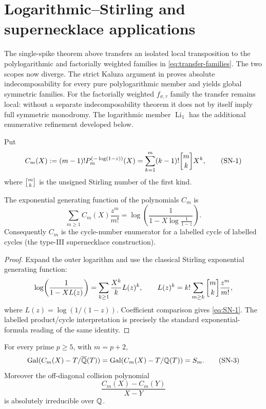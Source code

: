 \section{Logarithmic--Stirling and supernecklace applications}
\label{sec:supernecklace}

The single-spike theorem above transfers an isolated local transposition to
the polylogarithmic and factorially weighted families in
\eqref{eq:transfer-families}.  The two scopes now diverge.  The strict Kaluza
argument in  proves absolute indecomposability for
every pure polylogarithmic member and yields global symmetric families.  For
the factorially weighted $f_{\sigma,\tau}$ family the transfer remains local:
without a separate indecomposability theorem it does not by itself imply full
symmetric monodromy.  The logarithmic member $\operatorname{Li}_1$ has the
additional enumerative refinement developed below.

Put
\[
 C_m(X):=(m-1)!P_m^{(-\log(1-z))}(X)
 =\sum_{k=1}^m (k-1)!\stirling{m}{k}X^k,
 \tag{SN-1}\label{eq:SN-1}
\]
where \(\stirling{m}{k}\) is the unsigned Stirling number of the first kind.

\begin{proposition}
The exponential generating function of the polynomials \(C_m\) is
\[
 \boxed{\displaystyle
 \sum_{m\ge1}C_m(X)\frac{z^m}{m!}
 =\log\!\left(\frac{1}{1-X\log\frac1{1-z}}\right).}
 \tag{SN-2}
\]
Consequently \(C_m\) is the cycle-number enumerator for a labelled cycle of
labelled cycles (the type-III supernecklace construction).
\end{proposition}

\begin{proof}
Expand the outer logarithm and use the classical Stirling exponential
generating function:
\[
 \log\!\left(\frac1{1-X L(z)}\right)
 =\sum_{k\ge1}\frac{X^k}{k}L(z)^k,
 \qquad
 L(z)^k=k!\sum_{m\ge k}\stirling{m}{k}\frac{z^m}{m!},
\]
where \(L(z)=\log(1/(1-z))\).  Coefficient comparison gives
\eqref{eq:SN-1}.  The labelled product/cycle interpretation is precisely the
standard exponential-formula reading of the same identity.
\end{proof}

\begin{theorem}
For every prime \(p\ge5\), with \(m=p+2\),
\[
 \operatorname{Gal}(C_m(X)-T/\overline{\mathbb Q}(T))
 =\operatorname{Gal}(C_m(X)-T/\mathbb Q(T))=S_m.
 \tag{SN-3}\label{eq:SN-3}
\]
Moreover the off-diagonal collision polynomial
\[
 \boxed{\displaystyle
 \frac{C_m(X)-C_m(Y)}{X-Y}}
 \tag{SN-4}
\]
is absolutely irreducible over \(\mathbb Q\).
\end{theorem}

